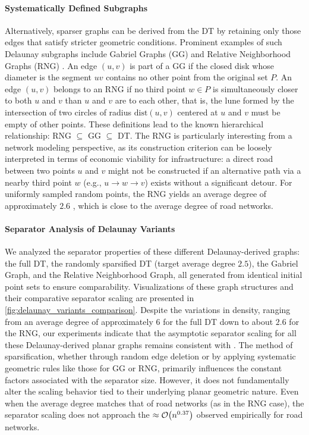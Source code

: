 \paragraph{Systematically Defined Subgraphs}

Alternatively, sparser graphs can be derived from the DT by retaining only those edges that satisfy stricter geometric conditions.
Prominent examples of such Delaunay subgraphs include Gabriel Graphs (GG) \cite{gabriel_new_1969} and Relative Neighborhood Graphs (RNG) \cite{toussaint_relative_1980}.
An edge \((u,v)\) is part of a GG if the closed disk whose diameter is the segment \(uv\) contains no other point from the original set \(P\).
An edge \((u,v)\) belongs to an RNG if no third point \(w \in P\) is simultaneously closer to both \(u\) and \(v\) than \(u\) and \(v\) are to each other,
that is, the lune formed by the intersection of two circles of radius \(\text{dist}(u,v)\) centered at \(u\) and \(v\) must be empty of other points.
These definitions lead to the known hierarchical relationship: RNG \(\subseteq\) GG \(\subseteq\) DT.
The RNG is particularly interesting from a network modeling perspective, as its construction criterion can be loosely interpreted in terms of economic viability for infrastructure: a direct road between two points \(u\) and \(v\) might not be constructed if an alternative path via a nearby third point \(w\) (e.g., \(u \to w \to v\)) exists without a significant detour.
For uniformly sampled random points, the RNG yields an average degree of approximately \(2.6\) \cite{buhl_topological_2006}, which is close to the average degree of road networks.

\paragraph{Separator Analysis of Delaunay Variants}

We analyzed the separator properties of these different Delaunay-derived graphs: the full DT, the randomly sparsified DT (target average degree \(2.5\)), the Gabriel Graph, and the Relative Neighborhood Graph, all generated from identical initial point sets to ensure comparability.
Visualizations of these graph structures and their comparative separator scaling are presented in \cref{fig:delaunay_variants_comparison}.
Despite the variations in density, ranging from an average degree of approximately 6 for the full DT down to about \(2.6\) for the RNG, our experiments indicate that the asymptotic separator scaling for all these Delaunay-derived planar graphs remains consistent with .
The method of sparsification, whether through random edge deletion or by applying systematic geometric rules like those for GG or RNG, primarily influences the constant factors associated with the separator size.
However, it does not fundamentally alter the  scaling behavior tied to their underlying planar geometric nature.
Even when the average degree matches that of road networks (as in the RNG case), the separator scaling does not approach the \(\approx \mathcal{O}\!\left(n^{0.37}\right)\) observed empirically for road networks.

